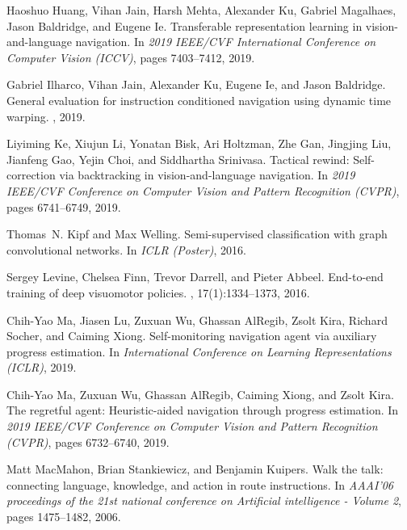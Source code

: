 \documentclass[final]{cvpr}
\begin{document}
\begin{thebibliography}{10}
    Haoshuo {Huang}, Vihan {Jain}, Harsh {Mehta}, Alexander {Ku}, Gabriel
      {Magalhaes}, Jason {Baldridge}, and Eugene {Ie}.
    \newblock Transferable representation learning in vision-and-language
      navigation.
    \newblock In {\em 2019 IEEE/CVF International Conference on Computer Vision
      (ICCV)}, pages 7403--7412, 2019.
    
    Gabriel {Ilharco}, Vihan {Jain}, Alexander {Ku}, Eugene {Ie}, and Jason
      {Baldridge}.
    \newblock General evaluation for instruction conditioned navigation using
      dynamic time warping.
    , 2019.
    
    Liyiming {Ke}, Xiujun {Li}, Yonatan {Bisk}, Ari {Holtzman}, Zhe {Gan}, Jingjing
      {Liu}, Jianfeng {Gao}, Yejin {Choi}, and Siddhartha {Srinivasa}.
    \newblock Tactical rewind: Self-correction via backtracking in
      vision-and-language navigation.
    \newblock In {\em 2019 IEEE/CVF Conference on Computer Vision and Pattern
      Recognition (CVPR)}, pages 6741--6749, 2019.
    
    Thomas~N. {Kipf} and Max {Welling}.
    \newblock Semi-supervised classification with graph convolutional networks.
    \newblock In {\em ICLR (Poster)}, 2016.
    
    Sergey {Levine}, Chelsea {Finn}, Trevor {Darrell}, and Pieter {Abbeel}.
    \newblock End-to-end training of deep visuomotor policies.
    , 17(1):1334--1373, 2016.
    
    Chih-Yao {Ma}, Jiasen {Lu}, Zuxuan {Wu}, Ghassan {AlRegib}, Zsolt {Kira},
      Richard {Socher}, and Caiming {Xiong}.
    \newblock Self-monitoring navigation agent via auxiliary progress estimation.
    \newblock In {\em International Conference on Learning Representations (ICLR)},
      2019.
    
    Chih-Yao {Ma}, Zuxuan {Wu}, Ghassan {AlRegib}, Caiming {Xiong}, and Zsolt
      {Kira}.
    \newblock The regretful agent: Heuristic-aided navigation through progress
      estimation.
    \newblock In {\em 2019 IEEE/CVF Conference on Computer Vision and Pattern
      Recognition (CVPR)}, pages 6732--6740, 2019.
    
    Matt {MacMahon}, Brian {Stankiewicz}, and Benjamin {Kuipers}.
    \newblock Walk the talk: connecting language, knowledge, and action in route
      instructions.
    \newblock In {\em AAAI'06 proceedings of the 21st national conference on
      Artificial intelligence - Volume 2}, pages 1475--1482, 2006.
    

\end{thebibliography}
\end{document}
